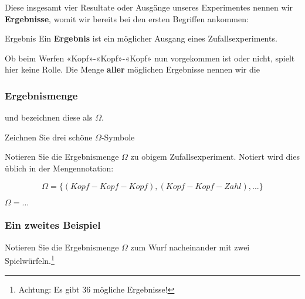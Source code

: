 
Diese insgesamt vier Resultate oder Ausgänge unseres Experimentes nennen wir \textbf{Ergebnisse}, womit wir bereits
bei den ersten Begriffen ankommen:

\begin{definition}{Ergebnis}{}
Ein \textbf{Ergebnis} ist ein möglicher Ausgang eines
Zufallsexperiments.
\end{definition}

Ob beim Werfen «Kopf»-«Kopf»-«Kopf» nun
vorgekommen ist oder nicht, spielt hier keine Rolle. Die Menge \textbf{aller}
möglichen Ergebnisse nennen wir die

\subsubsection{Ergebnismenge}

und bezeichnen diese als $\Omega$.

Zeichnen Sie drei schöne {\huge $\Omega$}-Symbole


Notieren Sie die Ergebnismenge $\Omega$ zu obigem
Zufallsexperiment. Notiert wird dies üblich in der Mengennotation:

$$\Omega = \{ (Kopf-Kopf-Kopf), (Kopf-Kopf-Zahl), ...\}$$

$\Omega = ...$

\newpage

\subsubsection{Ein zweites Beispiel}
Notieren Sie die Ergebnismenge $\Omega$ zum Wurf nacheinander mit zwei
Spielwürfeln.\footnote{Achtung: Es gibt 36 mögliche Ergebnisse!}

